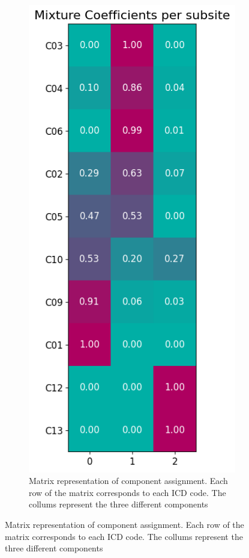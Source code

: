 \documentclass[
  sn-mathphys-num,
]{sn-jnl}
\begin{document}
\begin{figure}
\begin{minipage}{0.29\linewidth}
\begin{figure}[H]
{\includegraphics{figures/mixture_components_3_t_stages_new.png}

}

\caption{\label{fig-3-matrix}Matrix representation of component
assignment. Each row of the matrix corresponds to each ICD code. The
collums represent the three different components}

\end{figure}%

\end{minipage}%

\end{figure}%
\end{document}
